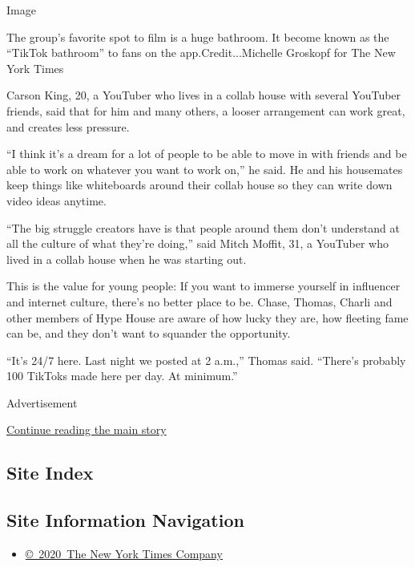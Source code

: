 Image

The group's favorite spot to film is a huge bathroom. It become known as
the ``TikTok bathroom'' to fans on the app.Credit...Michelle Groskopf
for The New York Times

Carson King, 20, a YouTuber who lives in a collab house with several
YouTuber friends, said that for him and many others, a looser
arrangement can work great, and creates less pressure.

``I think it's a dream for a lot of people to be able to move in with
friends and be able to work on whatever you want to work on,'' he said.
He and his housemates keep things like whiteboards around their collab
house so they can write down video ideas anytime.

``The big struggle creators have is that people around them don't
understand at all the culture of what they're doing,'' said Mitch
Moffit, 31, a YouTuber who lived in a collab house when he was starting
out.

This is the value for young people: If you want to immerse yourself in
influencer and internet culture, there's no better place to be. Chase,
Thomas, Charli and other members of Hype House are aware of how lucky
they are, how fleeting fame can be, and they don't want to squander the
opportunity.

``It's 24/7 here. Last night we posted at 2 a.m.,'' Thomas said.
``There's probably 100 TikToks made here per day. At minimum.''

Advertisement

\protect\hyperlink{after-bottom}{Continue reading the main story}

\hypertarget{site-index}{%
\subsection{Site Index}\label{site-index}}

\hypertarget{site-information-navigation}{%
\subsection{Site Information
Navigation}\label{site-information-navigation}}

\begin{itemize}
\tightlist
\item
  \href{https://help.nytimes3xbfgragh.onion/hc/en-us/articles/115014792127-Copyright-notice}{©~2020~The
  New York Times Company}
\end{itemize}

